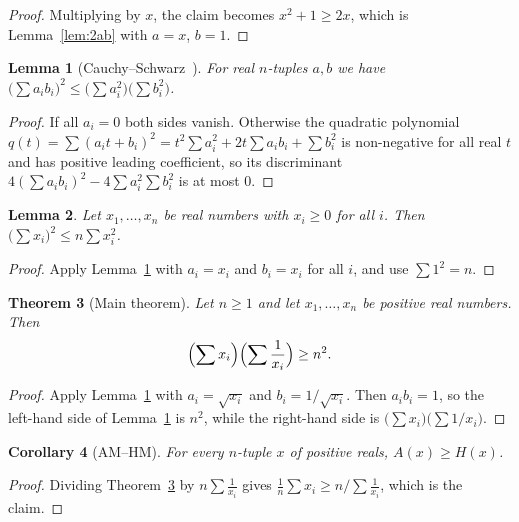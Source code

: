 \documentclass[11pt]{amsart}
\newtheorem{theorem}{Theorem}[section]
\newtheorem{lemma}[theorem]{Lemma}
\newtheorem{corollary}[theorem]{Corollary}
\theoremstyle{definition}
\theoremstyle{remark}
\begin{document}
\begin{proof}
Multiplying by $x$, the claim becomes $x^2+1\ge 2x$, which is
Lemma~\ref{lem:2ab} with $a=x$, $b=1$.
\end{proof}

\begin{lemma}[Cauchy--Schwarz~\cite{Cau}]\label{lem:CS}
For real $n$-tuples $a,b$ we have
$\bigl(\sum a_ib_i\bigr)^2\le\bigl(\sum a_i^2\bigr)\bigl(\sum b_i^2\bigr)$.
\end{lemma}

\begin{proof}
If all $a_i=0$ both sides vanish. Otherwise the quadratic polynomial
$q(t)=\sum(a_it+b_i)^2=t^2\sum a_i^2+2t\sum a_ib_i+\sum b_i^2$ is non-negative
for all real $t$ and has positive leading coefficient, so its discriminant
$4(\sum a_ib_i)^2-4\sum a_i^2\sum b_i^2$ is at most $0$.
\end{proof}

\begin{lemma}\label{lem:qm}
Let $x_1,\dots,x_n$ be real numbers with $x_i\ge 0$ for all $i$. Then
$\bigl(\sum x_i\bigr)^2\le n\sum x_i^2$.
\end{lemma}

\begin{proof}
Apply Lemma~\ref{lem:CS} with $a_i=x_i$ and $b_i=x_i$ for all $i$, and use
$\sum 1^2=n$.
\end{proof}

\begin{theorem}[Main theorem]\label{thm:main}
Let $n\ge 1$ and let $x_1,\dots,x_n$ be positive real numbers. Then
\[
  \Bigl(\sum x_i\Bigr)\Bigl(\sum\frac{1}{x_i}\Bigr)\ge n^2 .
\]
\end{theorem}

\begin{proof}
Apply Lemma~\ref{lem:CS} with $a_i=\sqrt{x_i}$ and $b_i=1/\sqrt{x_i}$. Then
$a_ib_i=1$, so the left-hand side of Lemma~\ref{lem:CS} is $n^2$, while the
right-hand side is $\bigl(\sum x_i\bigr)\bigl(\sum 1/x_i\bigr)$.
\end{proof}

\begin{corollary}[AM--HM]\label{cor:amhm}
For every $n$-tuple $x$ of positive reals, $A(x)\ge H(x)$.
\end{corollary}

\begin{proof}
Dividing Theorem~\ref{thm:main} by $n\sum\frac{1}{x_i}$ gives
$\frac1n\sum x_i\ge n\big/\sum\frac{1}{x_i}$, which is the claim.
\end{proof}
\end{document}
